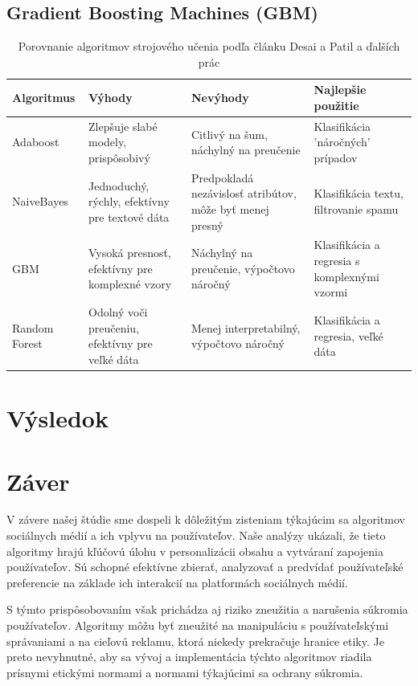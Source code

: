 \documentclass[12pt,twoside,slovak,a4paper]{article}
\begin{document}
\subsection{Gradient Boosting Machines (GBM)\cite{9952143}}



\begin{table}[h]
\centering
\begin{tabular}{|l|p{4cm}|p{4cm}|p{3cm}|}
\hline
\textbf{Algoritmus} & \textbf{Výhody} & \textbf{Nevýhody} & \textbf{Najlepšie použitie} \\
\hline
Adaboost & Zlepšuje slabé modely, prispôsobivý & Citlivý na šum, náchylný na preučenie & Klasifikácia 'náročných' prípadov \\
\hline
NaiveBayes & Jednoduchý, rýchly, efektívny pre textové dáta & Predpokladá nezávislosť atribútov, môže byť menej presný & Klasifikácia textu, filtrovanie spamu \\
\hline
GBM & Vysoká presnosť, efektívny pre komplexné vzory & Náchylný na preučenie, výpočtovo náročný & Klasifikácia a regresia s komplexnými vzormi \\
\hline
Random Forest & Odolný voči preučeniu, efektívny pre veľké dáta & Menej interpretabilný, výpočtovo náročný & Klasifikácia a regresia, veľké dáta \\
\hline
\end{tabular}
\caption{Porovnanie algoritmov strojového učenia podľa článku Desai a Patil \cite{7087040} a ďalších prác \cite{7809906,9952138,9952143}}
\label{table:algorithm_comparison}
\end{table}



\section{Výsledok}


\section{Záver} 

V závere našej štúdie sme dospeli k dôležitým zisteniam týkajúcim sa algoritmov sociálnych médií a ich vplyvu na používateľov. Naše analýzy ukázali, že tieto algoritmy hrajú kľúčovú úlohu v personalizácii obsahu a vytváraní zapojenia používateľov. Sú schopné efektívne zbierať, analyzovať a predvídať používateľské preferencie na základe ich interakcií na platformách sociálnych médií.

S týmto prispôsobovaním však prichádza aj riziko zneužitia a narušenia súkromia používateľov. Algoritmy môžu byť zneužité na manipuláciu s používateľskými správaniami a na cieľovú reklamu, ktorá niekedy prekračuje hranice etiky. Je preto nevyhnutné, aby sa vývoj a implementácia týchto algoritmov riadila prísnymi etickými normami a normami týkajúcimi sa ochrany súkromia.
\end{document}
